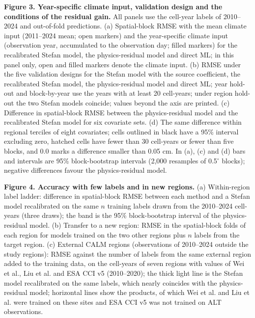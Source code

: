 \textbf{Figure 3. Year-specific climate input, validation design and the conditions of the residual gain.} All panels use the cell-year labels of 2010--2024 and out-of-fold predictions. (a) Spatial-block RMSE with the mean climate input (2011--2024 mean; open markers) and the year-specific climate input (observation year, accumulated to the observation day; filled markers) for the recalibrated Stefan model, the physics-residual model and direct ML; in this panel only, open and filled markers denote the climate input. (b) RMSE under the five validation designs for the Stefan model with the source coefficient, the recalibrated Stefan model, the physics-residual model and direct ML; year hold-out and block-by-year use the years with at least 20 cell-years; under region hold-out the two Stefan models coincide; values beyond the axis are printed. (c) Difference in spatial-block RMSE between the physics-residual model and the recalibrated Stefan model for six covariate sets. (d) The same difference within regional terciles of eight covariates; cells outlined in black have a 95\% interval excluding zero, hatched cells have fewer than 30 cell-years or fewer than five blocks, and 0.0 marks a difference smaller than 0.05 cm. In (a), (c) and (d) bars and intervals are 95\% block-bootstrap intervals (2,000 resamples of 0.5$^\circ$ blocks); negative differences favour the physics-residual model.

\textbf{Figure 4. Accuracy with few labels and in new regions.} (a) Within-region label ladder: difference in spatial-block RMSE between each method and a Stefan model recalibrated on the same $n$ training labels drawn from the 2010--2024 cell-years (three draws); the band is the 95\% block-bootstrap interval of the physics-residual model. (b) Transfer to a new region: RMSE in the spatial-block folds of each region for models trained on the two other regions plus $n$ labels from the target region. (c) External CALM regions (observations of 2010--2024 outside the study regions): RMSE against the number of labels from the same external region added to the training data, on the \nftrows{} cell-years of seven regions with values of Wei et al., Liu et al. and ESA CCI v5 (2010--2020); the thick light line is the Stefan model recalibrated on the same labels, which nearly coincides with the physics-residual model; horizontal lines show the products, of which Wei et al. and Liu et al. were trained on these sites and ESA CCI v5 was not trained on ALT observations.

